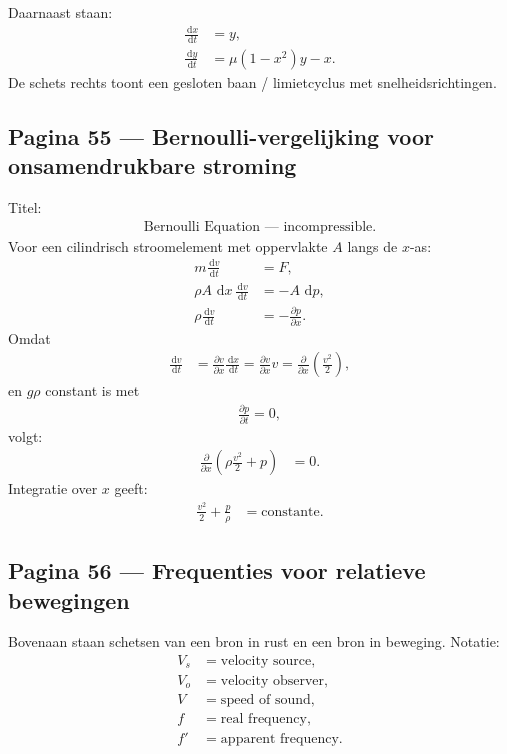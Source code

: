 \documentclass[11pt]{article}
\newcommand{\dd}{\,\mathrm{d}}
\newcommand{\pd}[2]{\frac{\partial #1}{\partial #2}}
\newcommand{\td}[2]{\frac{\dd #1}{\dd #2}}
\begin{document}
Daarnaast staan:
\begin{align*}
\td{x}{t} &= y,\\
\td{y}{t} &= \mu(1-x^2)y-x.
\end{align*}
De schets rechts toont een gesloten baan / limietcyclus met snelheidsrichtingen.

\subsection*{Pagina 55 --- Bernoulli-vergelijking voor onsamendrukbare stroming}

Titel:
\begin{align*}
\text{Bernoulli Equation --- incompressible}.
\end{align*}
Voor een cilindrisch stroomelement met oppervlakte $A$ langs de $x$-as:
\begin{align*}
m\td{v}{t}&=F,\\
\rho A\,\dd x\,\td{v}{t}&=-A\,\dd p,\\
\rho\td{v}{t}&=-\pd{p}{x}.
\end{align*}
Omdat
\begin{align*}
\td{v}{t}
&=
\pd{v}{x}\td{x}{t}
=
\pd{v}{x}v
=
\pd{}{x}\left(\frac{v^2}{2}\right),
\end{align*}
en $g\rho$ constant is met
\begin{align*}
\pd{p}{t}=0,
\end{align*}
volgt:
\begin{align*}
\pd{}{x}
\left(
\rho\frac{v^2}{2}+p
\right)
&=0.
\end{align*}
Integratie over $x$ geeft:
\begin{align*}
\frac{v^2}{2}+\frac{p}{\rho}
&=
\text{constante}.
\end{align*}

\subsection*{Pagina 56 --- Frequenties voor relatieve bewegingen}

Bovenaan staan schetsen van een bron in rust en een bron in beweging. Notatie:
\begin{align*}
V_s&=\text{velocity source},\\
V_o&=\text{velocity observer},\\
V&=\text{speed of sound},\\
f&=\text{real frequency},\\
f'&=\text{apparent frequency}.
\end{align*}
\end{document}
